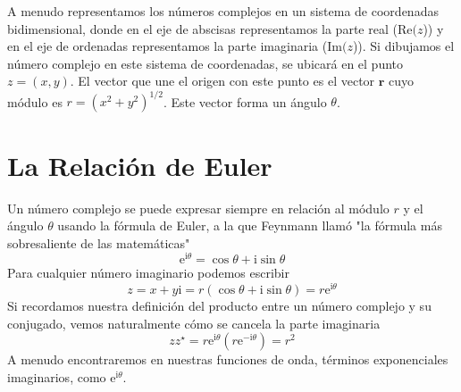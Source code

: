 A menudo representamos los números complejos en un sistema de coordenadas
bidimensional, donde en el eje de abscisas representamos la parte 
real ($\mathrm{Re}(z$)) y en el eje de ordenadas representamos la 
parte imaginaria ($\mathrm{Im}(z$)). Si dibujamos el número complejo 
en este sistema de coordenadas, se ubicará en el punto $z=(x,y)$.
El vector que une el origen con este punto es el vector $\mathbf{r}$ 
cuyo módulo es $r=(x^2 + y^2)^{1/2}$. Este vector forma
un ángulo $\theta$.

\section{La Relación de Euler}
Un número complejo se puede expresar siempre en relación al módulo
$r$ y el ángulo $\theta$ usando la fórmula de Euler,  
a la que Feynmann llamó "la fórmula más sobresaliente de las
matemáticas"
\begin{equation}
    \mathrm{e}^{\mathrm{i}\theta} = \cos{\theta} + \mathrm{i}\sin{\theta}
\end{equation}
Para cualquier número imaginario podemos escribir
\begin{equation}
    z = x + y\mathrm{i} = r(\cos{\theta} + \mathrm{i}\sin{\theta})=
    r\mathrm{e}^{\mathrm{i}\theta}
\end{equation}
Si recordamos nuestra definición del producto entre un número 
complejo y su conjugado, vemos naturalmente cómo se cancela la
parte imaginaria
\begin{equation}
    zz^\star=r\mathrm{e}^{\mathrm{i}\theta}(r\mathrm{e}^{-\mathrm{i}\theta})= r^2
\end{equation}
A menudo encontraremos en nuestras funciones de onda, términos
exponenciales imaginarios, como $\mathrm{e}^{\mathrm{i}\theta}$.





